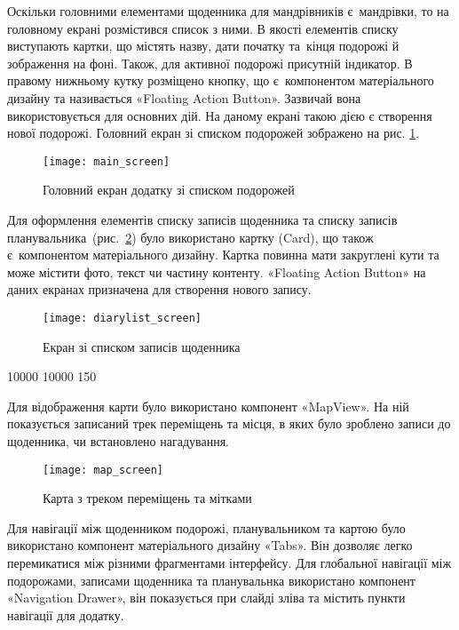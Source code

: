 \documentclass[../main.tex]{subfiles}
\begin{document}
Оскільки головними елементами щоденника для мандрівників є~мандрівки, то на головному екрані розмістився список з ними. В якості елементів списку виступають картки, що містять назву, дати початку та~кінця подорожі й зображення на фоні. Також, для активної подорожі присутній індикатор. В правому нижньому кутку розміщено кнопку, що є~компонентом матеріального дизайну та називається «Floating Action Button». Зазвичай вона використовується для основних дій. На даному екрані такою дією є створення нової подорожі. Головний екран зі списком подорожей зображено на рис. \ref{figure:main_screen}.

\begin{figure}[H]
	\centering
	\texttt{[image: main\_screen]}
	\caption{Головний екран додатку зі списком подорожей}
	\label{figure:main_screen}
\end{figure}

Для оформлення елементів списку записів щоденника та списку записів планувальника~(рис.~\ref{figure:diary_list_screen}) було використано картку (Card), що також є~компонентом матеріального дизайну. Картка повинна мати закруглені кути та може містити фото, текст чи частину контенту. «Floating Action Button» на даних екранах призначена для створення нового запису.

\begin{figure}[H]
	\centering
	\texttt{[image: diarylist\_screen]}
	\caption{Екран зі списком записів щоденника}
	\label{figure:diary_list_screen}
\end{figure}

{	
 10000 10000 150

Для відображення карти було використано компонент «MapView». На ній показується записаний трек переміщень та місця, в яких було зроблено записи до щоденника, чи встановлено нагадування.

}

\begin{figure}[H]
	\centering
	\texttt{[image: map\_screen]}
	\caption{Карта з треком переміщень та мітками}
	\label{figure:map_screen}
\end{figure}

Для навігації між щоденником подорожі, планувальником та картою було використано компонент матеріального дизайну «Tabs». Він дозволяє легко перемикатися між різними фрагментами інтерфейсу. Для глобальної навігації між подорожами, записами щоденника та планувальнка використано компонент «Navigation Drawer», він показується при слайді зліва та містить пункти навігації для додатку. 
\end{document}
